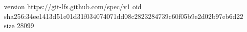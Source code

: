 version https://git-lfs.github.com/spec/v1
oid sha256:34ee1413d51e01d31f034074071dd08c2823284739c60f05b9e2d02b97eb6d22
size 28099
